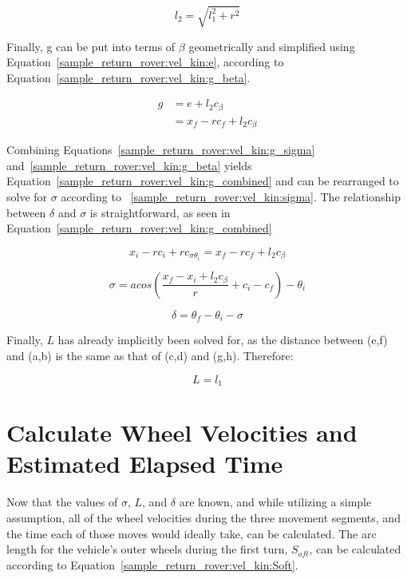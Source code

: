 \begin{equation}\label{sample_return_rover:vel_kin:l2}
	l_{2} = \sqrt{l_{1}^2 + r^2}
\end{equation}

Finally, g can be put into terms of $\beta$ geometrically and simplified using Equation~\ref{sample_return_rover:vel_kin:e}, according to Equation~\ref{sample_return_rover:vel_kin:g_beta}.

\begin{equation}\label{sample_return_rover:vel_kin:g_beta}
	\begin{split}
		g & = e + l_{2}c_{\beta} \\
		& = x_{f} - rc_{f} + l_{2}c_{\beta}
	\end{split}
\end{equation}

Combining Equations~\ref{sample_return_rover:vel_kin:g_sigma} and~\ref{sample_return_rover:vel_kin:g_beta} yields Equation~\ref{sample_return_rover:vel_kin:g_combined} and can be rearranged to solve for $\sigma$ according to ~\ref{sample_return_rover:vel_kin:sigma}. The relationship between $\delta$ and $\sigma$ is straightforward, as seen in Equation~\ref{sample_return_rover:vel_kin:g_combined}

\begin{equation}\label{sample_return_rover:vel_kin:g_combined}
	x_{i} - rc_{i} + rc_{\sigma\theta_{i}} = x_{f} - rc_{f} + l_{2}c_{\beta}
\end{equation}

\begin{equation}\label{sample_return_rover:vel_kin:sigma}
	\sigma = acos\left(\frac{x_{f} - x_{i} + l_{2}c_{\beta}}{r} + c_{i} - c_{f}\right) - \theta_{i}
\end{equation}

\begin{equation}\label{sample_return_rover:vel_kin:delta}
	\delta = \theta_{f} - \theta_{i} - \sigma
\end{equation}

Finally, $L$ has already implicitly been solved for, as the distance between (e,f) and (a,b) is the same as that of (c,d) and (g,h). Therefore:

\begin{equation}\label{sample_return_rover:vel_kin:L}
	L = l_{1}
\end{equation}

\section{Calculate Wheel Velocities and Estimated Elapsed Time}
Now that the values of $\sigma$, $L$, and $\delta$ are known, and while utilizing a simple assumption, all of the wheel velocities during the three movement segments, and the time each of those moves would ideally take, can be calculated. The arc length for the vehicle's outer wheels during the first turn, $S_{oft}$, can be calculated according to Equation~\ref{sample_return_rover:vel_kin:Soft}.

